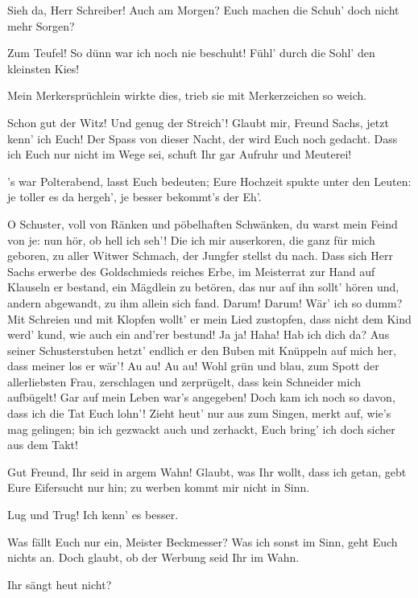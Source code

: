 \begin{drama}
Sieh da, Herr Schreiber! Auch am Morgen?
Euch machen die Schuh' doch nicht mehr Sorgen?

\Beckmesserspeaks
Zum Teufel! So dünn war ich noch nie beschuht!
Fühl' durch die Sohl' den kleinsten Kies!

\Sachsspeaks
Mein Merkersprüchlein wirkte dies,
trieb sie mit Merkerzeichen so weich.

\Beckmesserspeaks
Schon gut der Witz! Und genug der Streich'!
Glaubt mir, Freund Sachs, jetzt kenn' ich Euch!
Der Spass von dieser Nacht, der wird Euch noch gedacht.
Dass ich Euch nur nicht im Wege sei,
schuft Ihr gar Aufruhr und Meuterei!

\Sachsspeaks
's war Polterabend, lasst Euch bedeuten;
Eure Hochzeit spukte unter den Leuten:
je toller es da hergeh', je besser bekommt's der Eh'.

\Beckmesserspeaks


O Schuster, voll von Ränken
und pöbelhaften Schwänken,
du warst mein Feind von je:
nun hör, ob hell ich seh'!
Die ich mir auserkoren,
die ganz für mich geboren,
zu aller Witwer Schmach,
der Jungfer stellst du nach.
Dass sich Herr Sachs erwerbe
des Goldschmieds reiches Erbe,
im Meisterrat zur Hand
auf Klauseln er bestand,
ein Mägdlein zu betören,
das nur auf ihn sollt' hören
und, andern abgewandt,
zu ihm allein sich fand.
Darum! Darum!
Wär' ich so dumm?
Mit Schreien und mit Klopfen
wollt' er mein Lied zustopfen,
dass nicht dem Kind werd' kund,
wie auch ein and'rer bestund!
Ja ja! Haha! Hab ich dich da?
Aus seiner Schusterstuben
hetzt' endlich er den Buben
mit Knüppeln auf mich her,
dass meiner los er wär'!
Au au! Au au! Wohl grün und blau,
zum Spott der allerliebsten Frau,
zerschlagen und zerprügelt,
dass kein Schneider mich aufbügelt!
Gar auf mein Leben war's angegeben!
Doch kam ich noch so davon,
dass ich die Tat Euch lohn'!
Zieht heut' nur aus zum Singen,
merkt auf, wie's mag gelingen;
bin ich gezwackt auch und zerhackt,
Euch bring' ich doch sicher aus dem Takt!

\Sachsspeaks
Gut Freund, Ihr seid in argem Wahn!
Glaubt, was Ihr wollt, dass ich getan,
gebt Eure Eifersucht nur hin;
zu werben kommt mir nicht in Sinn.

\Beckmesserspeaks
Lug und Trug! Ich kenn' es besser.

\Sachsspeaks
Was fällt Euch nur ein, Meister Beckmesser?
Was ich sonst im Sinn, geht Euch nichts an.
Doch glaubt, ob der Werbung seid Ihr im Wahn.

\Beckmesserspeaks
Ihr sängt heut nicht?


\end{drama}
